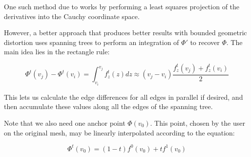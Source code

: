 One such method due to \cite[Chen \& Weber 2015]{bdhm-2015} works by performing a least squares projection of the derivatives into the Cauchy coordinate space.

However, a better approach that %
produces better results with bounded geometric distortion uses spanning trees to perform an integration of $\Phi'$ to recover $\Phi$. The main idea lies in the rectangle rule:

\begin{equation}
\Phi^t(v_j) - \Phi^t(v_i) = \int_{v_i}^{v_j} f_z^t(z) dz \approx (v_j-v_i) \frac{f_z^t(v_j) + f_z^t(v_i)}{2}
\end{equation}

This lets us calculate the edge differences for all edges in parallel if desired, and then accumulate these values along all the edges of the spanning tree.


Note that we also need one anchor point $\Phi(v_0)$. This point, chosen by the user on the original mesh, may be linearly interpolated according to the equation:

$$\Phi^t(v_0) = (1-t) f^0(v_0) + t f^1(v_0)$$



 


 
